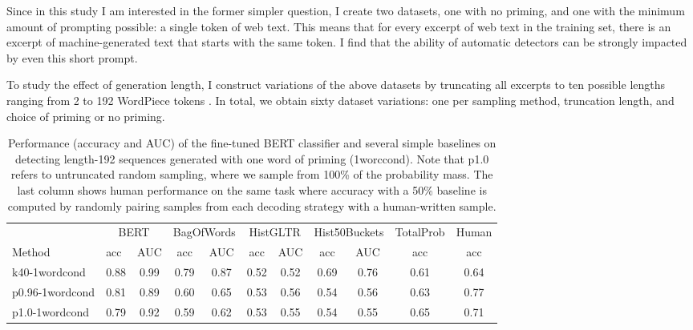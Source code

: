 Since in this study I am interested in the former simpler question, I create two datasets, one with no priming, and one with the minimum amount of prompting possible: a single token of web text.
This means that for every excerpt of web text in the training set, there is an excerpt of machine-generated text that starts with the same token.
I find that the ability of automatic detectors can be strongly impacted by even this short prompt.

To study the effect of generation length, I construct variations of the above datasets by truncating all excerpts to ten possible lengths ranging from 2 to 192 WordPiece tokens \cite{wu2016google}. In total, we obtain sixty dataset variations: one per sampling method, truncation length, and choice of priming or no priming.


\begin{table}[t]
  \centering
  \small
  \caption{Performance (accuracy and AUC) of the fine-tuned BERT classifier and several simple baselines on detecting length-192 sequences generated with one word of priming (1worccond). Note that p1.0 refers to untruncated random sampling, where we sample from 100\% of the probability mass. The last column shows human performance on the same task where accuracy with a 50\% baseline is computed by randomly pairing samples from each decoding strategy with a human-written sample.}
    \begin{tabular}{|l||cc||cc|cc|cc|c||c|}
    \hline
          & \multicolumn{2}{c||}{BERT} & \multicolumn{2}{c|}{BagOfWords} & \multicolumn{2}{c|}{HistGLTR} & \multicolumn{2}{c|}{Hist50Buckets} & \multicolumn{1}{l||}{TotalProb} & \multicolumn{1}{l|}{Human} \\
    Method & \multicolumn{1}{l}{acc} & \multicolumn{1}{c||}{AUC} & \multicolumn{1}{c}{acc} & \multicolumn{1}{c|}{AUC} & \multicolumn{1}{c}{acc} & \multicolumn{1}{c|}{AUC} & \multicolumn{1}{c}{acc} & \multicolumn{1}{c|}{AUC} & \multicolumn{1}{c||}{acc} & \multicolumn{1}{c|}{acc}\\
    \hline
    k40-1wordcond & 0.88  & 0.99  & 0.79  & 0.87  & 0.52  & 0.52  & 0.69  & 0.76  & 0.61 & 0.64 \\
    p0.96-1wordcond & 0.81  & 0.89  & 0.60  & 0.65  & 0.53  & 0.56  & 0.54  & 0.56  & 0.63 & 0.77 \\
    p1.0-1wordcond & 0.79  & 0.92  & 0.59  & 0.62  & 0.53  & 0.55  & 0.54  & 0.55  & 0.65 & 0.71\\
    \hline
    \end{tabular}%
  \label{tab:baselines}%
\end{table}%

